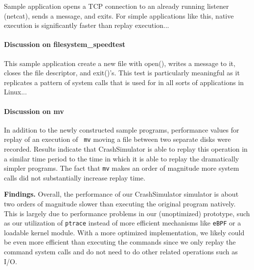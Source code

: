Sample application opens a TCP connection to an already running listener (netcat), sends a message, and
exits. For simple applications like this, native execution is significantly faster than replay execution...

\paragraph{Discussion on filesystem\_speedtest}

This sample application create a new file with open(), writes a message to it, closes the file descriptor, and
exit()'s. This test is particularly meaningful as it replicates a pattern of system calls that is used for in
all sorts of applications in Linux...

\paragraph{Discussion on mv}

In addition to the newly constructed sample programs, performance values for replay of an execution of {\tt
  mv} moving a file between two separate disks were recorded.  Results indicate that CrashSimulator is able to
replay this operation in a similar time period to the time in which it is able to replay the dramatically
simpler programs.  The fact that {\tt mv} makes an order of magnitude more system calls did not substantially
increase replay time.

{\bf Findings.}
Overall, the performance of our CrashSimulator simulator is about two orders of
magnitude slower than executing the original program natively.  This is 
largely due to performance problems in our (unoptimized) prototype, such as
our utilization of {\tt ptrace} instead of more efficient mechanisms like
{\tt eBPF} or a loadable kernel module.  With a more optimized
implementation, we likely could be even more efficient than executing the
commands since we only replay the command system calls and do not need to
do other related operations such as I/O.
